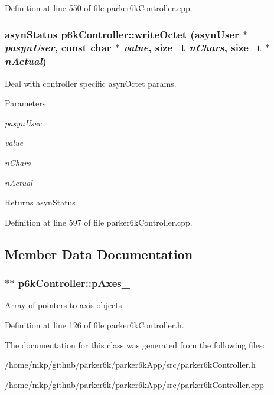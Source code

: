 Definition at line 550 of file parker6kController.cpp.\hypertarget{classp6kController_a673297b9788a7a52afb9ed452eb7c03e}{
\subsubsection[{writeOctet}]{\setlength{\rightskip}{0pt plus 5cm}asynStatus p6kController::writeOctet (asynUser $\ast$ {\em pasynUser}, \/  const char $\ast$ {\em value}, \/  size\_\-t {\em nChars}, \/  size\_\-t $\ast$ {\em nActual})}}
\label{classp6kController_a673297b9788a7a52afb9ed452eb7c03e}
Deal with controller specific asynOctet params. 
\begin{DoxyParams}{Parameters}
\item[{\em pasynUser}]\item[{\em value}]\item[{\em nChars}]\item[{\em nActual}]\end{DoxyParams}
\begin{DoxyReturn}{Returns}
asynStatus 
\end{DoxyReturn}


Definition at line 597 of file parker6kController.cpp.

\subsection{Member Data Documentation}
\hypertarget{classp6kController_a2c283d187ff47b5dd24c3fcd68b1cfa3}{
\subsubsection[{pAxes\_\-}]{$\ast$$\ast$ {\bf p6kController::pAxes\_\-}}}
\label{classp6kController_a2c283d187ff47b5dd24c3fcd68b1cfa3}
Array of pointers to axis objects 

Definition at line 126 of file parker6kController.h.

The documentation for this class was generated from the following files:\begin{DoxyCompactItemize}
\item 
/home/mkp/github/parker6k/parker6kApp/src/parker6kController.h\item 
/home/mkp/github/parker6k/parker6kApp/src/parker6kController.cpp\end{DoxyCompactItemize}
